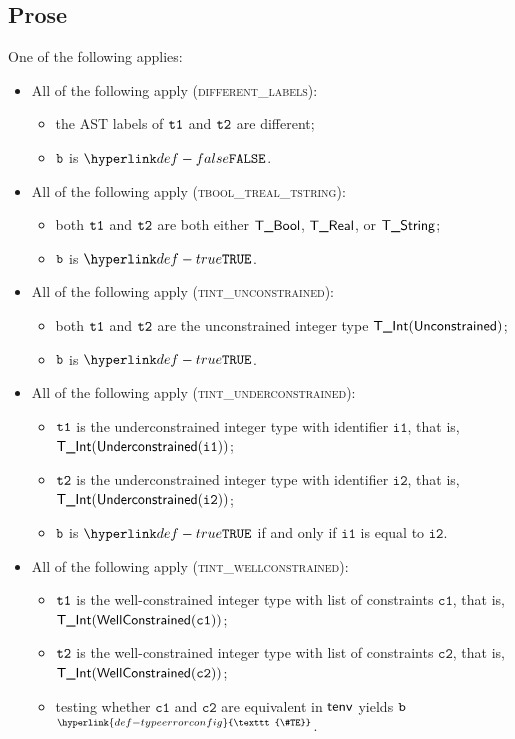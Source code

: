 \documentclass{book}
\newcommand\TypeErrorConfig[0]{\hyperlink{def-typeerrorconfig}{\texttt{\#TE}}}
\newcommand\ProseOrTypeError[0]{\hyperlink{def-proseortypeerror}{$^{\TypeErrorConfig}$}}
\newcommand\vcone[0]{\texttt{c1}}
\newcommand\vctwo[0]{\texttt{c2}}
\newcommand\vione[0]{\texttt{i1}}
\newcommand\vitwo[0]{\texttt{i2}}
\begin{document}
\subsection{Prose}
One of the following applies:
\begin{itemize}
  \item All of the following apply (\textsc{different\_labels}):
  \begin{itemize}
    \item the AST labels of $\texttt{t1}$ and $\texttt{t2}$ are different;
    \item $\texttt{b}$ is $\False$.
  \end{itemize}

  \item All of the following apply (\textsc{tbool\_treal\_tstring}):
  \begin{itemize}
    \item both $\texttt{t1}$ and $\texttt{t2}$ are both either $\textsf{T\_Bool}$, $\textsf{T\_Real}$, or $\textsf{T\_String}$;
    \item $\texttt{b}$ is $\True$.
  \end{itemize}

  \item All of the following apply (\textsc{tint\_unconstrained}):
  \begin{itemize}
    \item both $\texttt{t1}$ and $\texttt{t2}$ are the unconstrained integer type $\textsf{T\_Int}(\textsf{Unconstrained})$;
    \item $\texttt{b}$ is $\True$.
  \end{itemize}

  \item All of the following apply (\textsc{tint\_underconstrained}):
  \begin{itemize}
    \item $\texttt{t1}$ is the underconstrained integer type with identifier $\vione$, that is, \\ $\TInt(\underconstrained(\vione))$;
    \item $\texttt{t2}$ is the underconstrained integer type with identifier $\vitwo$, that is, \\ $\TInt(\underconstrained(\vitwo))$;
    \item $\texttt{b}$ is $\True$ if and only if $\vione$ is equal to $\vitwo$.
  \end{itemize}

  \item All of the following apply (\textsc{tint\_wellconstrained}):
  \begin{itemize}
    \item $\texttt{t1}$ is the well-constrained integer type with list of constraints $\vcone$, that is, \\ $\TInt(\wellconstrained(\vcone))$;
    \item $\texttt{t2}$ is the well-constrained integer type with list of constraints $\vctwo$, that is, \\ $\TInt(\wellconstrained(\vctwo))$;
    \item testing whether $\vcone$ and $\vctwo$ are equivalent in $\textsf{tenv}$ yields $\texttt{b}$ \ProseOrTypeError.
  \end{itemize}


\end{itemize}
\end{document}
